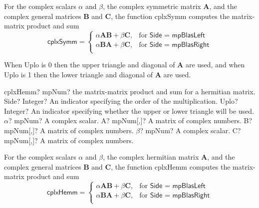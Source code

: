 \vspace{0.3cm}
For the complex scalars $\alpha$ and $\beta$, the complex symmetric matrix $\boldsymbol{A}$, and the complex general matrices $\boldsymbol{B}$ and $\boldsymbol{C}$, the function \textsf{cplxSymm} computes the matrix-matrix product and sum 
\begin{equation}
\textsf{cplxSymm}=\begin{cases}
\alpha \boldsymbol{A} \boldsymbol{B} + \beta \boldsymbol{C}, & \text{for } \textsf{Side = mpBlasLeft} \\
\alpha \boldsymbol{B} \boldsymbol{A} + \beta \boldsymbol{C}, & \text{for } \textsf{Side = mpBlasRight} \\		
\end{cases}
\end{equation}

When \textsf{Uplo} is 0 then the upper triangle and diagonal of $\boldsymbol{A}$ are used, and when \textsf{Uplo} is 1 then the lower triangle and diagonal of $\boldsymbol{A}$ are used. 


\newpage
\begin{mpFunctionsExtract}
	\mpFunctionSeven
	{cplxHemm? mpNum? the matrix-matrix product and sum for a hermitian matrix.}
	{Side? Integer? An indicator specifying the order of the multiplication.}
	{Uplo? Integer? An indicator specifying whether the upper or lower triangle will be used.}
	{$\alpha$? mpNum? A complex scalar.}
	{A? mpNum[,]? A matrix of complex numbers.}
	{B? mpNum[,]? A matrix of complex numbers.}
	{$\beta$? mpNum? A complex scalar.}
	{C? mpNum[,]? A matrix of complex numbers.}
\end{mpFunctionsExtract}

\vspace{0.3cm}
For the complex scalars $\alpha$ and $\beta$, the complex hermitian matrix $\boldsymbol{A}$, and the complex general matrices $\boldsymbol{B}$ and $\boldsymbol{C}$, the function \textsf{cplxHemm} computes the matrix-matrix product and sum 
\begin{equation}
\textsf{cplxHemm}=\begin{cases}
\alpha \boldsymbol{A} \boldsymbol{B} + \beta \boldsymbol{C}, & \text{for } \textsf{Side = mpBlasLeft} \\
\alpha \boldsymbol{B} \boldsymbol{A} + \beta \boldsymbol{C}, & \text{for } \textsf{Side = mpBlasRight} \\		
\end{cases}
\end{equation}

